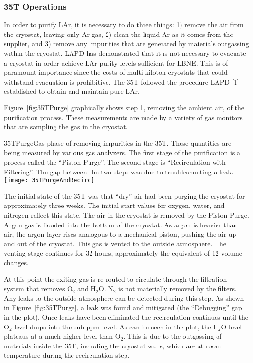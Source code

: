 \subsubsection {35T Operations}

In order to purify LAr, it is necessary to do three things: 1) remove the air from the cryostat, leaving only Ar gas, 2) clean the liquid Ar as it comes from the supplier, and 3) remove any impurities that are generated by materials outgassing within the cryostat.  
LAPD has demonstrated that it is not necessary to evacuate a cryostat in order achieve LAr purity levels sufficient for LBNE. This is of paramount importance since the costs of multi-kiloton cryostats that could withstand evacuation is prohibitive. The 35T followed the procedure LAPD [1] established to obtain and maintain pure LAr. 


Figure~\ref{fig:35TPurge} graphically shows step 1, removing the ambient air, of the purification process. These measurements are made by a variety of gas monitors that are sampling the gas in the cryostat. 

\begin{cdrfigure}{35TPurge}{Gas phase of removing impurities in the 35T. These quantities are being measured by various gas analyzers. The first stage of the purification is a process called the ``Piston Purge''.  The second stage is ``Recirculation with Filtering''. The gap between the two steps was due to troubleshooting a leak.}
  \texttt{[image: 35TPurgeAndRecirc]}
\end{cdrfigure}

The initial state of the 35T was that ``dry'' air had been purging the cryostat for approximately three weeks. The initial start values for oxygen, water, and nitrogen reflect this state.
The air in the cryostat is removed by  the Piston Purge.  Argon gas is flooded into the bottom of the cryostat. As argon is heavier than air, the argon layer rises analogous to a mechanical piston, pushing the air up and out of the cryostat. This gas is vented to the outside atmosphere. The venting stage continues for 32 hours, approximately the equivalent of 12 volume changes. 

At this point the exiting gas is re-routed to circulate through the filtration system that removes O$_2$ and H$_2$O. N$_2$ is not materially removed by the filters. Any leaks to the outside atmosphere can be detected during this step. As shown in Figure~\ref{fig:35TPurge}, a leak was found and mitigated (the ``Debugging'' gap in the plot). Once leaks have been eliminated the recirculation continues until the O$_2$ level drops into the sub-ppm level. As can be seen in the plot, the H$_2$O level plateaus at a much higher level than O$_2$. This is due to the outgassing of materials inside the 35T, including the cryostat walls, which are at room temperature during the recirculation step. 

